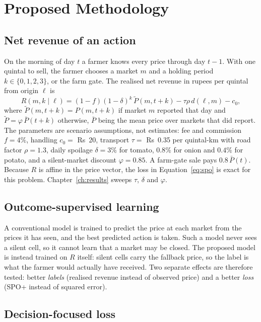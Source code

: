 \section{Proposed Methodology}
\label{sec:proposed}

\subsection{Net revenue of an action}
\label{sec:formulation}

On the morning of day $t$ a farmer knows every price through day $t-1$. With one quintal to sell, the farmer chooses a market $m$ and a holding period $k\in\{0,1,2,3\}$, or the farm gate. The realised net revenue in rupees per quintal from origin $\ell$ is
\begin{equation}
R(m,k\mid\ell)=(1-f)(1-\delta)^{k}\,\tilde P(m,t{+}k)-\tau\rho\,d(\ell,m)-c_0,
\label{eq:revenue}
\end{equation}
where $\tilde P(m,t{+}k)=P(m,t{+}k)$ if market $m$ reported that day and $\tilde P=\varphi\,\bar P(t{+}k)$ otherwise, $\bar P$ being the mean price over markets that did report. The parameters are scenario assumptions, not estimates: fee and commission $f=4\%$, handling $c_0=$ Rs~20, transport $\tau=$ Rs~0.35 per quintal-km with road factor $\rho=1.3$, daily spoilage $\delta=3\%$ for tomato, $0.8\%$ for onion and $0.4\%$ for potato, and a silent-market discount $\varphi=0.85$. A farm-gate sale pays $0.8\,\bar P(t)$. Because $R$ is affine in the price vector, the loss in Equation~\ref{eq:spo} is exact for this problem. Chapter~\ref{ch:results} sweeps $\tau$, $\delta$ and $\varphi$.

\subsection{Outcome-supervised learning}

A conventional model is trained to predict the price at each market from the prices it has seen, and the best predicted action is taken. Such a model never sees a silent cell, so it cannot learn that a market may be closed. The proposed model is instead trained on $R$ itself: silent cells carry the fallback price, so the label is what the farmer would actually have received. Two separate effects are therefore tested: better \emph{labels} (realised revenue instead of observed price) and a better \emph{loss} (SPO+ instead of squared error).

\subsection{Decision-focused loss}

